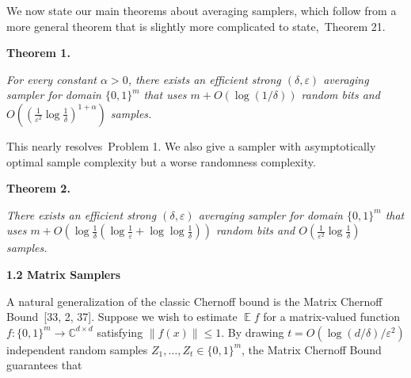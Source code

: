 


We now state our main theorems about averaging samplers, which follow from a more general theorem that is slightly more complicated to state, Theorem 21.\par





\par\medskip\noindent\textbf{
\textbf{Theorem 1}\textbf{.}
}\par



\emph{For every constant $\alpha>0$, there exists an efficient strong $(\delta,\varepsilon)$ averaging sampler for domain $\{0,1\}^{m}$ that uses $m+O(\log(1/\delta))$ random bits and $O((\frac{1}{\varepsilon^{2}}\log\frac{1}{\delta})^{1+\alpha})$ samples.}\par






This nearly resolves Problem 1. We also give a sampler with asymptotically optimal sample complexity but a worse randomness complexity.\par





\par\medskip\noindent\textbf{
\textbf{Theorem 2}\textbf{.}
}\par



\emph{There exists an efficient strong $(\delta,\varepsilon)$ averaging sampler for domain $\{0,1\}^{m}$ that uses $m+O(\log\frac{1}{\delta}(\log\frac{1}{\varepsilon}+\log\log\frac{1}{\delta}))$ random bits and $O(\frac{1}{\varepsilon^{2}}\log\frac{1}{\delta})$ samples.}\par







\par\medskip\noindent\textbf{
1.2 Matrix Samplers}\par




A natural generalization of the classic Chernoff bound is the Matrix Chernoff Bound [33, 2, 37]. Suppose we wish to estimate $\operatorname*{\mathbb{E}}f$ for a matrix-valued function $f:\{0,1\}^{m}\to\mathbb{C}^{d\times d}$ satisfying $\left\lVert f(x)\right\rVert\leq 1$.
By drawing $t=O(\log(d/\delta)/\varepsilon^{2})$ independent random samples $Z_{1},\dots,Z_{t}\in\{0,1\}^{m}$, the
Matrix Chernoff Bound guarantees that\par


